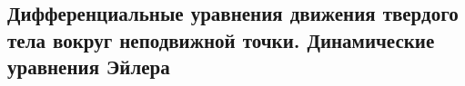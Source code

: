 

\subsection{Дифференциальные уравнения движения твердого тела вокруг неподвижной точки. Динамические уравнения Эйлера}



